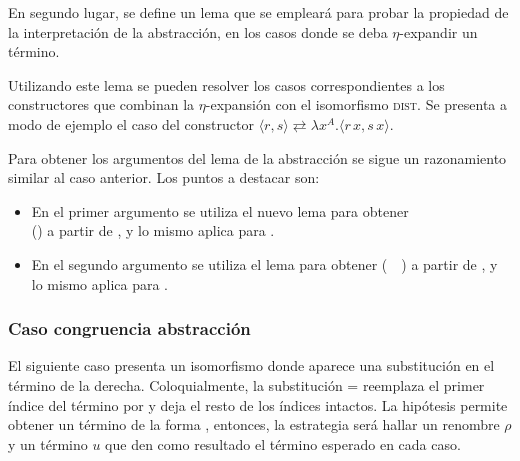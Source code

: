 En segundo lugar, se define un lema que se empleará para probar la propiedad de la interpretación de la abstracción, en los casos donde se deba $\eta$-expandir un término.


Utilizando este lema se pueden resolver los casos correspondientes a los constructores que combinan la $\eta$-expansión con el isomorfismo \textsc{dist}.
Se presenta a modo de ejemplo el caso del constructor  $\langle r,s \rangle \rightleftarrows \lambda x^A. \langle r \, x,s \, x \rangle$.


Para obtener los argumentos del lema de la abstracción se sigue un razonamiento similar al caso anterior.
Los puntos a destacar son:
\begin{itemize}
	\item En el primer argumento se utiliza el nuevo lema  para obtener \\ \snstar() a partir de , y lo mismo aplica para .
	
	
	\item En el segundo argumento se utiliza el lema  para obtener \snstar(~~) a partir de , y lo mismo aplica para .
\end{itemize}

\subsubsection{Caso congruencia abstracción}

El siguiente caso presenta un isomorfismo donde aparece una substitución en el término de la derecha.
Coloquialmente, la substitución
  =
\cons
{\const{[}  \const{]≡} }
{}
reemplaza el primer índice del término por
\const{[}  \const{]≡} 
y deja el resto de los índices intactos.
La hipótesis  permite obtener un término de la forma
\snstar
{}, entonces, la estrategia será hallar un renombre $\rho$ y un término $u$ que den como resultado el término esperado en cada caso.

